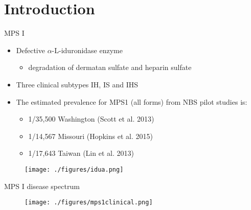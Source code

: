 \documentclass[presentation, smaller]{beamer}
\begin{document}
\section{Introduction}
\label{sec:orgheadline4}
\begin{frame}[label={sec:orgheadline1}]{MPS I}
\begin{itemize}
\item Defective \(\alpha\)-L-iduronidase enzyme
\begin{itemize}
\item degradation of dermatan sulfate and heparin sulfate
\end{itemize}
\item Three clinical subtypes IH, IS and IHS

\item The estimated prevalence for MPS1 (all forms) from NBS pilot studies is: 
\begin{itemize}
\item 1/35,500 Washington ​(Scott et al. 2013)
\item 1/14,567 Missouri ​(Hopkins et al. 2015)
\item 1/17,643 Taiwan ​(Lin et al. 2013)
\end{itemize}
\end{itemize}


\begin{figure}[htb]
\centering
\texttt{[image: ./figures/idua.png]}
\label{fig:idua}
\end{figure}
\end{frame}


\begin{frame}[label={sec:orgheadline2}]{MPS I disease spectrum}
\begin{figure}[htb]
\centering
\texttt{[image: ./figures/mps1clinical.png]}
\label{fig:mps1}
\end{figure}
\end{frame}
\end{document}
